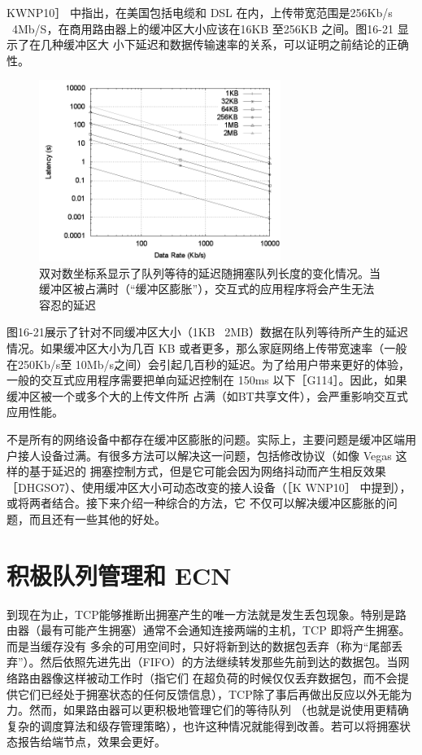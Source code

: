 KWNP10］ 中指出，在美国包括电缆和 DSL 在内，上传带宽范围是256Kb/s ~4Mb/S，在商用路由器上的缓冲区大小应该在16KB 至256KB 之间。图16-21 显示了在几种缓冲区大
小下延迟和数据传输速率的关系，可以证明之前结论的正确性。


\begin{figure}[!htb]
    \centering
	\includegraphics[width=0.7\textwidth]{imgs/16/16-21.png}
	\caption{双对数坐标系显示了队列等待的延迟随拥塞队列长度的变化情况。当缓冲区被占满时（“缓冲区膨胀”），交互式的应用程序将会产生无法容忍的延迟}
\end{figure}

图16-21展示了针对不同缓冲区大小（1KB ~2MB）数据在队列等待所产生的延迟情况。如果缓冲区大小为几百 KB 或者更多，那么家庭网络上传带宽速率（一般在250Kb/s至
10Mb/s之间）会引起几百秒的延迟。为了给用户带来更好的体验，一般的交互式应用程序需要把单向延迟控制在 150ms 以下［G114］。因此，如果缓冲区被一个或多个大的上传文件所
占满（如BT共享文件），会严重影响交互式应用性能。

不是所有的网络设备中都存在缓冲区膨胀的问题。实际上，主要问题是缓冲区端用户接人设备过满。有很多方法可以解决这一问题，包括修改协议（如像 Vegas 这样的基于延迟的
拥塞控制方式，但是它可能会因为网络抖动而产生相反效果 ［DHGSO7）、使用缓冲区大小可动态改变的接人设备（［K WNP10］ 中提到），或将两者结合。接下来介绍一种综合的方法，它
不仅可以解决缓冲区膨胀的问题，而且还有一些其他的好处。

\section{积极队列管理和 ECN}
到现在为止，TCP能够推断出拥塞产生的唯一方法就是发生丢包现象。特别是路由器（最有可能产生拥塞）通常不会通知连接两端的主机，TCP 即将产生拥塞。而是当缓存没有
多余的可用空间时，只好将新到达的数据包丢弃（称为“尾部丢弃”）。然后依照先进先出（FIFO）的方法继续转发那些先前到达的数据包。当网络路由器像这样被动工作时（指它们
在超负荷的时候仅仅丢弃数据包，而不会提供它们已经处于拥塞状态的任何反馈信息），TCP除了事后再做出反应以外无能为力。然而，如果路由器可以更积极地管理它们的等待队列
（也就是说使用更精确复杂的调度算法和级存管理策略），也许这种情况就能得到改善。若可以将拥塞状态报告给端节点，效果会更好。

